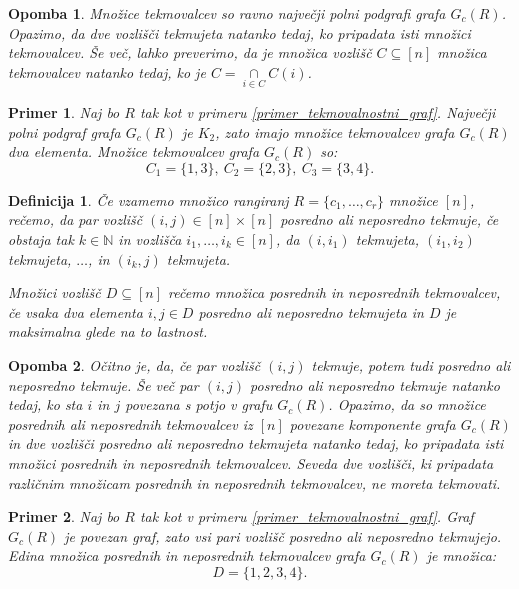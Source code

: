 \documentclass[a4paper, 12pt]{book}
\newtheorem{definicija}{Definicija}[chapter]
\newtheorem{primer}{Primer}[chapter]
\newtheorem{opomba}{Opomba}[chapter]
\begin{document}
\begin{opomba}
    Množice tekmovalcev so ravno največji polni podgrafi grafa $G_c(R)$. Opazimo, da dve vozlišči tekmujeta natanko tedaj, ko pripadata isti množici tekmovalcev. Še več, lahko preverimo, da je množica vozlišč $C \subseteq [n]$ množica tekmovalcev natanko tedaj, ko je $C = \underset{i \in C}{\cap}C(i)$.
\end{opomba}

\begin{primer}
    Naj bo $R$ tak kot v primeru \ref{primer_tekmovalnostni_graf}. Največji polni podgraf grafa $G_c(R)$ je $K_2$, zato imajo množice tekmovalcev grafa $G_c(R)$ dva elementa. Množice tekmovalcev grafa $G_c(R)$ so:
    \[
        C_1 = \{ 1, 3 \}, \ C_2 = \{ 2, 3 \}, \ C_3 = \{ 3, 4 \}.
    \]
\end{primer}

\begin{definicija}
    Če vzamemo množico rangiranj $R = \{ c_1, \dots, c_r\}$ množice $[n]$, rečemo, da par vozlišč $(i, j) \in [n] \times [n]$ posredno ali neposredno tekmuje, če obstaja tak $k \in \mathbb{N}$ in vozlišča $i_1, \dots, i_k \in [n]$, da $(i, i_1)$ tekmujeta, $(i_1, i_2)$ tekmujeta, $\dots$, in $(i_k, j)$ tekmujeta.

    Množici vozlišč $D \subseteq [n]$ rečemo množica posrednih in neposrednih tekmovalcev, če vsaka dva elementa $i, j \in D$ posredno ali neposredno tekmujeta in $D$ je maksimalna glede na to lastnost.
\end{definicija}

\begin{opomba}
    Očitno je, da, če par vozlišč $(i, j)$ tekmuje, potem tudi posredno ali neposredno tekmuje. Še več par $(i, j)$ posredno ali neposredno tekmuje natanko tedaj, ko sta $i$ in $j$ povezana s potjo v grafu $G_c(R)$. Opazimo, da so množice posrednih ali neposrednih tekmovalcev iz $[n]$ povezane komponente grafa $G_c(R)$ in dve vozlišči posredno ali neposredno tekmujeta natanko tedaj, ko pripadata isti množici posrednih in neposrednih tekmovalcev. Seveda dve vozlišči, ki pripadata različnim množicam posrednih in neposrednih tekmovalcev, ne moreta tekmovati.
\end{opomba}

\begin{primer}
    Naj bo $R$ tak kot v primeru \ref{primer_tekmovalnostni_graf}. Graf $G_c(R)$ je povezan graf, zato vsi pari vozlišč posredno ali neposredno tekmujejo. Edina množica posrednih in neposrednih tekmovalcev grafa $G_c(R)$ je množica:
    \[
        D = \{ 1, 2, 3, 4 \}.
    \]
\end{primer}
\end{document}
